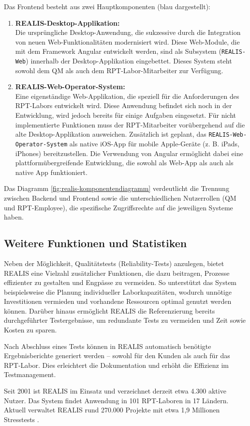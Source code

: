 Das Frontend besteht aus zwei Hauptkomponenten (blau dargestellt):
\begin{enumerate}
    \item \textbf{REALIS-Desktop-Applikation:} \\
Die ursprüngliche Desktop-Anwendung, die sukzessive durch die Integration von neuen Web-Funktionalitäten modernisiert wird. Diese Web-Module, die mit dem Framework Angular entwickelt werden, sind als Subsystem (\texttt{REALIS-Web}) innerhalb der Desktop-Applikation eingebettet. Dieses System steht sowohl dem \gls{QM} als auch dem \gls{RPT}-Labor-Mitarbeiter zur Verfügung.

\item \textbf{REALIS-Web-Operator-System:} \\
Eine eigenständige Web-Applikation, die speziell für die Anforderungen des \gls{RPT}-Labors entwickelt wird. Diese Anwendung befindet sich noch in der Entwicklung, wird jedoch bereits für einige Aufgaben eingesetzt. Für nicht implementierte Funktionen muss der \gls{RPT}-Mitarbeiter vorübergehend auf die alte Desktop-Applikation ausweichen. Zusätzlich ist geplant, das \texttt{REALIS-Web-Operator-System} als native iOS-App für mobile Apple-Geräte (z. B. iPads, iPhones) bereitzustellen. Die Verwendung von Angular ermöglicht dabei eine plattformübergreifende Entwicklung, die sowohl als Web-App als auch als native App funktioniert.
\end{enumerate}

Das Diagramm \ref{fig:realis-komponentendiagramm} verdeutlicht die Trennung zwischen Backend und Frontend sowie die unterschiedlichen Nutzerrollen (\gls{QM} und \gls{RPT}-Employee), die spezifische Zugriffsrechte auf die jeweiligen Systeme haben.


\subsection{Weitere Funktionen und Statistiken}
Neben der Möglichkeit, Qualitätstests (Reliability-Tests) anzulegen, bietet \gls{REALIS} eine Vielzahl zusätzlicher Funktionen, die dazu beitragen, Prozesse effizienter zu gestalten und Engpässe zu vermeiden. So unterstützt das System beispielsweise die Planung individueller Laborkapazitäten, wodurch unnötige Investitionen vermieden und vorhandene Ressourcen optimal genutzt werden können. Darüber hinaus ermöglicht \gls{REALIS} die Referenzierung bereits durchgeführter Testergebnisse, um redundante Tests zu vermeiden und Zeit sowie Kosten zu sparen.

Nach Abschluss eines Tests können in \gls{REALIS} automatisch benötigte Ergebnisberichte generiert werden – sowohl für den Kunden als auch für das \gls{RPT}-Labor. Dies erleichtert die Dokumentation und erhöht die Effizienz im Testmanagement.

Seit 2001 ist \gls{REALIS} im Einsatz und verzeichnet derzeit etwa 4.300 aktive Nutzer. Das System findet Anwendung in 101 \gls{RPT}-Laboren in 17 Ländern. Aktuell verwaltet \gls{REALIS} rund 270.000 Projekte mit etwa 1,9 Millionen Stresstests \cite{REALISPowerPointIntern}.